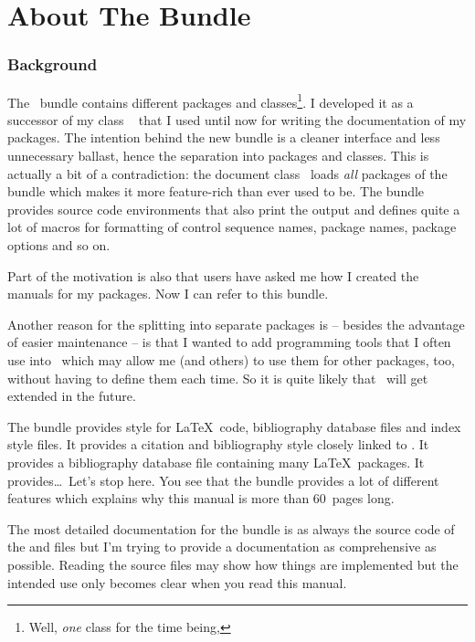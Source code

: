 \documentclass[load-preamble+,babel-options={ngerman,english}]{cnltx-doc}
\newcommand*\file[1]{\code{#1}}
\begin{document}
\part{About The Bundle}

\section{Background}

The \cnltx\ bundle contains different packages and classes\footnote{Well,
  \emph{one} class for the time being,}.  I developed it as a successor of my
class ~\cite{cls:cnpkgdoc} that I used until now for writing the
documentation of my packages.  The intention behind the new bundle is a
cleaner interface and less unnecessary ballast, hence the separation into
packages and classes.  This is actually a bit of a contradiction: the document
class \cnltxdoc\ loads \emph{all} packages of the bundle which makes it more
feature-rich than  ever used to be.  The bundle provides source
code environments that also print the output and defines quite a lot of macros
for formatting of control sequence names, package names, package options and
so on.

Part of the motivation is also that users have asked me how I created the
manuals for my packages.  Now I can refer to this bundle.

Another reason for the splitting into separate packages is -- besides the
advantage of easier maintenance -- is that I wanted to add programming tools
that I often use into \cnltxbase\ which may allow me (and others) to use them
for other packages, too, without having to define them each time.  So it is
quite likely that \cnltxbase\ will get extended in the future.

The bundle provides  style for \LaTeX\ code, bibliography
database files and index style files.  It provides a  citation
and bibliography style closely linked to \cnltxdoc.  It provides a
bibliography database file containing many \LaTeX\ packages.  It
provides\ldots\ Let's stop here.  You see that the bundle provides a lot of
different features which explains why this manual is more than 60~pages long.

The most detailed documentation for the bundle is as always the source code of
the \file{sty} and \file{cls} files but I'm trying to provide a documentation
as comprehensive as possible.  Reading the source files may show how things
are implemented but the intended use only becomes clear when you read this
manual.
\end{document}
